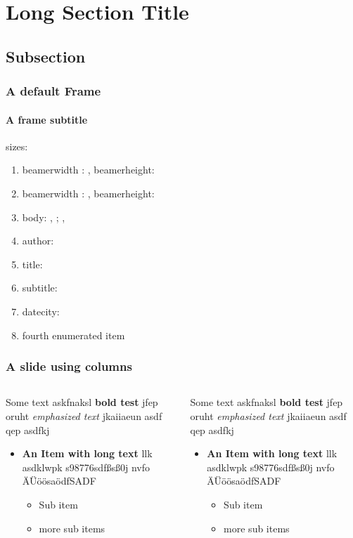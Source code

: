 \documentclass[german,aspectratio=169,notoc,titlestyle=white,structurestyle=white]{tudbeamer}%
\begin{document}
\section[ShortSection]{Long Section Title}	
\subsection{Subsection}
\begin{frame}
	\frametitle{A default Frame}
	\framesubtitle{A frame subtitle}
	sizes:
	\begin{enumerate}
		\item beamerwidth : \the\paperwidth, beamerheight: \the\paperheight
		\item beamerwidth : \number\paperwidth, beamerheight:\number\paperheight
		\item body: \the\bodyx, \the\bodyy; \the\bodywidth, \the\bodywidth
		\item author: \insertauthor
		\item title: \inserttitle
		\item subtitle: \insertsubtitle
		\item datecity: \insertdatecity
		\item fourth enumerated item
	\end{enumerate}
\end{frame}
\begin{frame}
	\frametitle{A slide using columns}
	\begin{columns}
	   	\begin{column}{.5\textwidth}
	   		Some text askfnaksl \textbf{bold test} jfep oruht \emph{emphasized text} jkaiiaeun asdf qep  asdfkj  
	   		\begin{itemize}
	   			\item \textbf{An Item with long text} llk asdklwpk s98776sdfßsß0j nvfo ÄÜöösaödfSADF
	   			\begin{itemize}
	   				\item Sub item
	   				\item more sub items
	   			\end{itemize}
	   		\end{itemize}
		\end{column}
	   	\begin{column}{.5\textwidth}
	   		Some text askfnaksl \textbf{bold test} jfep oruht \emph{emphasized text} jkaiiaeun asdf qep  asdfkj  
	   		\begin{itemize}
	   			\item \textbf{An Item with long text} llk asdklwpk s98776sdfßsß0j nvfo ÄÜöösaödfSADF
	   			\begin{itemize}
	   				\item Sub item
	   				\item more sub items
	   			\end{itemize}
	   		\end{itemize}
		\end{column}
	\end{columns}
\end{frame}
\end{document}
